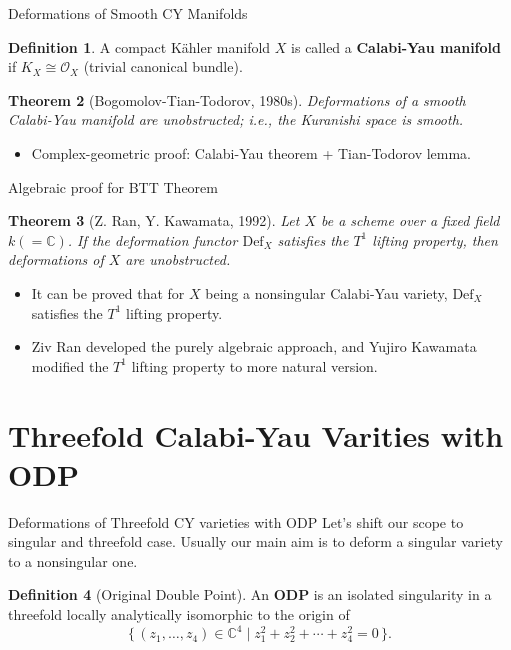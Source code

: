 \documentclass{beamer}
\theoremstyle{definition}
\newtheorem{defn}{Definition}
\theoremstyle{plain}
\newtheorem{thm}[defn]{Theorem}
\begin{document}
\begin{frame}{Deformations of Smooth CY Manifolds}
    \begin{defn}
        A compact Kähler manifold $X$ is called a \textbf{Calabi-Yau manifold} if $K_X \cong \mathcal{O}_X$ (trivial canonical bundle).
    \end{defn}
    \pause
    \begin{thm}[Bogomolov-Tian-Todorov, 1980s]
        Deformations of a smooth Calabi-Yau manifold are unobstructed; i.e., the Kuranishi space is smooth.
    \end{thm}
    \pause
    \begin{itemize}
        \item Complex-geometric proof: Calabi-Yau theorem + Tian-Todorov lemma.
    \end{itemize}
\end{frame}

\begin{frame}{Algebraic proof for BTT Theorem}
    \begin{thm}[Z. Ran, Y. Kawamata, 1992]
        Let $ X $ be a scheme over a fixed field $ k(=\mathbb{C} ) $. If the deformation functor $ \text{Def}_X $ satisfies the $T^1$ lifting property, then deformations of $ X $ are unobstructed.
    \end{thm}
    \pause
    \begin{itemize}
        \item It can be proved that for $ X $ being a nonsingular Calabi-Yau variety, $ \text{Def}_X $ satisfies the $ T^1 $ lifting property.
        \pause
        \item Ziv Ran developed the purely algebraic approach, and Yujiro Kawamata modified the $T^1$ lifting property to more natural version.
    \end{itemize}
\end{frame}


\section{Threefold Calabi-Yau Varities with ODP}

\begin{frame}{Deformations of Threefold CY varieties with ODP}
    Let's shift our scope to singular and threefold case. Usually our main aim is to deform a singular variety to a nonsingular one.
    \begin{defn}[Original Double Point]
        An \textbf{ODP} is an isolated singularity in a threefold locally analytically isomorphic to the origin of 
        \[
        \{\, (z_1,\dots,z_{4})\in\mathbb{C}^{4} \mid z_1^2+z_2^2+\cdots+z_{4}^2 = 0 \,\}.
        \]
    \end{defn}
\end{frame}
\end{document}
